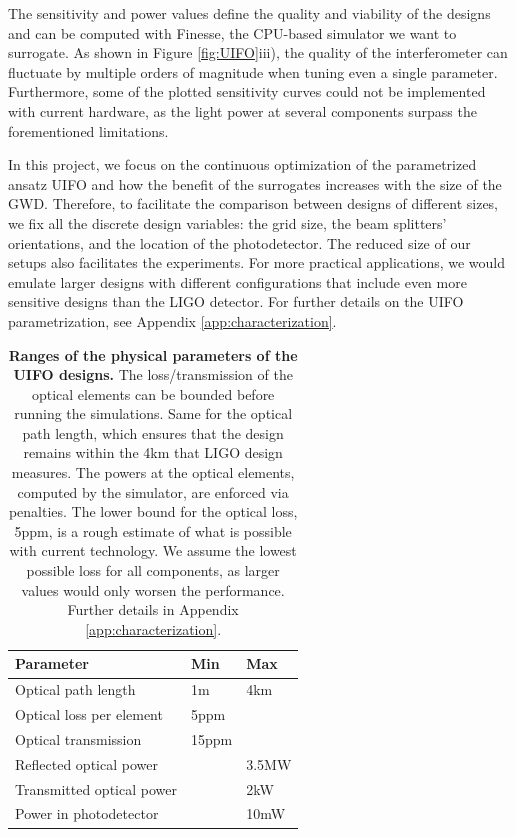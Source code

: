 \documentclass[a4paper,twocolumn,11pt,unpublished]{quantumarticle}
\begin{document}
The sensitivity and power values define the quality and viability of the designs and can be computed with Finesse, the CPU-based simulator we want to surrogate. As shown in Figure \ref{fig:UIFO}iii), the quality of the interferometer can fluctuate by multiple orders of magnitude when tuning even a single parameter. Furthermore, some of the plotted sensitivity curves could not be implemented with current hardware, as the light power at several components surpass the forementioned limitations.

In this project, we focus on the continuous optimization of the parametrized ansatz UIFO and how the benefit of the surrogates increases with the size of the GWD. Therefore, to facilitate the comparison between designs of different sizes, we fix all the discrete design variables: the grid size, the beam splitters' orientations, and the location of the photodetector. The reduced size of our setups also facilitates the experiments. For more practical applications, we would emulate larger designs with different configurations that include even more sensitive designs than the LIGO detector. For further details on the UIFO parametrization, see Appendix \ref{app:characterization}.

\begin{table}[h!]
\centering
\begin{tabular}{@{}lll@{}}
\toprule
\textbf{Parameter}        & \textbf{Min} & \textbf{Max} \\ \midrule
Optical path length             & 1m           & 4km          \\
Optical loss per element& 5ppm         &              \\
Optical transmission     & 15ppm        &              \\
Reflected optical power   &              & 3.5MW        \\
Transmitted optical power &              & 2kW          \\
Power in photodetector    &              & 10mW         \\ \bottomrule
\end{tabular}
\caption{\textbf{Ranges of the physical parameters of the UIFO designs.} The loss/transmission of the optical elements can be bounded before running the simulations. Same for the optical path length, which ensures that the design remains within the 4km that LIGO design measures. The powers at the optical elements, computed by the simulator, are enforced via penalties. The lower bound for the optical loss, 5ppm, is a rough estimate of what is possible with current technology. We assume the lowest possible loss for all components, as larger values would only worsen the performance. Further details in Appendix \ref{app:characterization}.}
\label{tab:bounds}
\end{table}
\end{document}
